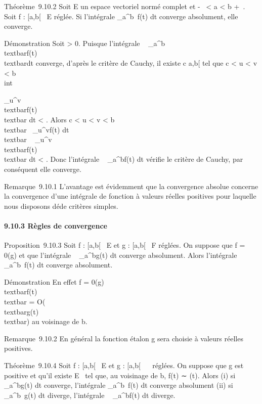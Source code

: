 \documentclass[]{article}
\begin{document}
Théorème~9.10.2 Soit E un espace vectoriel normé complet et -\infty~
\textless{} a \textless{} b \leq +\infty~. Soit f : {[}a,b{[}\rightarrow~ E réglée. Si
l'intégrale \int  \_a^b~f(t) dt
converge absolument, elle converge.

Démonstration Soit \epsilon \textgreater{} 0. Puisque l'intégrale
\int ~
\_a^b\\textbar{}f(t)\\textbar{}dt
converge, d'après le critère de Cauchy, il existe c \in {[}a,b{[} tel que
c \textless{} u \textless{} v \textless{} b \rigtharrow~\\int

\_u^v\\textbar{}f(t)\\textbar{}
dt \textless{} \epsilon. Alors c \textless{} u \textless{} v \textless{} b
\rigtharrow~\\textbar{}\int ~
\_u^vf(t) dt\\textbar{}
\leq\int ~
\_u^v\\textbar{}f(t)\\textbar{}
dt \textless{} \epsilon. Donc l'intégrale \int ~
\_a^bf(t) dt vérifie le critère de Cauchy, par conséquent
elle converge.

Remarque~9.10.1 L'avantage est évidemment que la convergence absolue
concerne la convergence d'une intégrale de fonction à valeurs réelles
positives pour laquelle nous disposons dé de critères simples.

\paragraph{9.10.3 Règles de convergence}

Proposition~9.10.3 Soit f : {[}a,b{[}\rightarrow~ E et g : {[}a,b{[}\rightarrow~ F réglées. On
suppose que f = 0(g) et que l'intégrale \int ~
\_a^bg(t) dt converge absolument. Alors l'intégrale
\int  \_a^b~f(t) dt converge
absolument.

Démonstration En effet f = 0(g) \Leftrightarrow
\\textbar{}f(t)\\textbar{} =
O(\\textbar{}g(t)\\textbar{}) au voisinage
de b.

Remarque~9.10.2 En général la fonction étalon g sera choisie à valeurs
réelles positives.

Théorème~9.10.4 Soit f : {[}a,b{[}\rightarrow~ E et g : {[}a,b{[}\rightarrow~ ~ réglées. On
suppose que g est positive et qu'il existe \ell \in E
\diagdown\0\ tel que, au voisinage de b, f(t)
∼ \ellg(t). Alors (i) si \int ~
\_a^bg(t) dt converge, l'intégrale
\int  \_a^b~f(t) dt converge
absolument (ii) si \int  \_a^b~g(t)
dt diverge, l'intégrale \int ~
\_a^bf(t) dt diverge.
\end{document}
